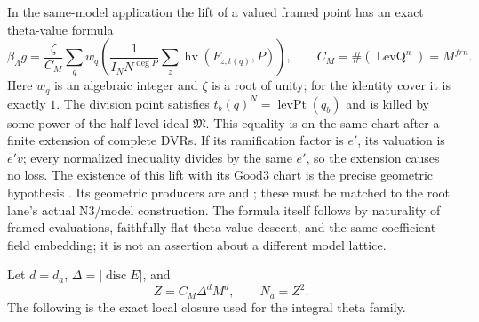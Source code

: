 In the same-model application the lift of a valued framed point
has an exact theta-value formula
\begin{equation}\label{eq:ftb-local-theta-value}
 \beta_\Lambda g
  =\frac{\zeta}{C_M}
        \sum_q w_q
         \left(\frac1{I_N N^{\deg P}}
               \sum_z\operatorname{hv}(F_{z,t(q)},P)\right),
 \qquad
 C_M=\#(\operatorname{LevQ}^n)=M^{frn}.
\end{equation}
Here \(w_q\) is an algebraic integer and \(\zeta\) is a root of
unity; for the identity cover it is exactly \(1\).
The division point satisfies
\(t_b(q)^N=\operatorname{levPt}(q_b)\) and is killed by some power
of the half-level ideal \(\mathfrak M\).
This equality is on the same chart after a finite extension of
complete DVRs.  If its ramification factor is \(e'\), its
valuation is \(e'v\); every normalized inequality divides by the
same \(e'\), so the extension causes no loss.
The existence of this lift with its \(\mathrm{Good3}\) chart is
the precise geometric hypothesis
.
Its geometric producers are
 and
; these must
be matched to the root lane's actual N3/model construction.
The formula itself follows by naturality of framed evaluations,
faithfully flat theta-value descent, and the same coefficient-field
embedding; it is not an assertion about a different model lattice.

Let \(d=d_a\), \(\Delta=|\operatorname{disc}E|\), and
\begin{equation}\label{eq:ftb-one-Z}
                       Z=C_M\Delta^dM^d,\qquad N_a=Z^2 .
\end{equation}
The following is the exact local closure used for the integral
theta family.

